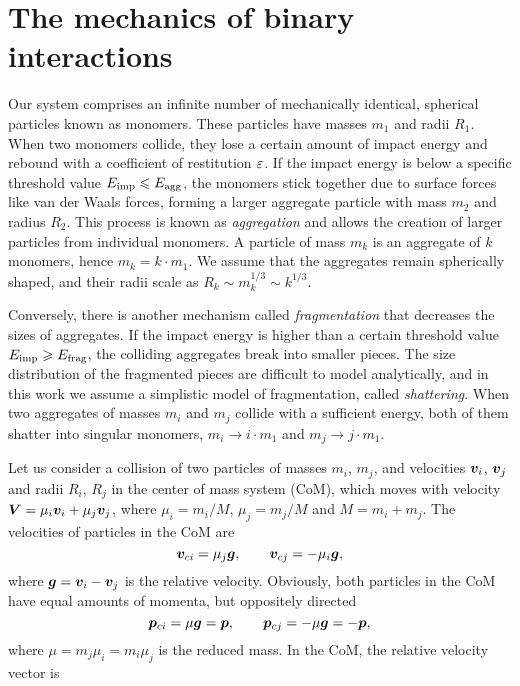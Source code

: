 \documentclass[aps,prl,preprint,groupedaddress,10pt]{revtex4-2}
\begin{document}
\section{The mechanics of binary interactions}
Our system comprises an infinite number of mechanically identical, spherical particles 
known as monomers. These particles have masses $m_1$ and radii $R_1$. When two 
monomers collide, they lose a certain amount of impact energy and rebound with a 
coefficient of restitution $\varepsilon$. If the impact energy is below a specific threshold 
value $E_{\mathrm{imp}}\leqslant E_{\mathrm{agg}}$, the monomers stick together due to surface 
forces like van der Waals forces, forming a larger aggregate particle with mass $m_2$ 
and radius $R_2$. This process is known as \emph{aggregation} and allows the creation 
of larger particles from individual monomers. A particle of mass $m_k$ is an aggregate
of $k$ monomers, hence $m_k=k\cdot m_1$. We assume that the aggregates remain 
spherically shaped, and their radii scale as $R_k\sim m_k^{1/3}\sim k^{1/3}$.

Conversely, there is another mechanism called \emph{fragmentation} that decreases the 
sizes of aggregates. If the impact energy is higher than a certain threshold value 
$E_{\mathrm{imp}}\geqslant E_{\mathrm{frag}}$, the colliding aggregates break into smaller pieces.
The size distribution of the fragmented pieces are difficult to model analytically, and
in this work we assume a simplistic model of fragmentation, called \emph{shattering}.
When two aggregates of masses $m_i$ and $m_j$ collide with a sufficient energy, both 
of them shatter into singular monomers, $m_i\to i\cdot m_1$ and $m_j\to j\cdot m_1$.

Let us consider a collision of two particles of masses $m_i$, $m_j$, and velocities 
$\vb*{v}_i$, $\vb*{v}_j$ and radii $R_i$, $R_j$ in the center of mass system (CoM), which moves 
with velocity $\vb*{V}=\mu_i\vb*{v}_i+\mu_j\vb*{v}_j$, where $\mu_i=m_i/M$, $\mu_j=m_j/M$ and 
$M=m_i+m_j$. The velocities of particles in the CoM are 
\begin{equation}
    \vb*{v}_{ci}=\mu_j\vb*{g},\qquad\vb*{v}_{cj}=-\mu_i\vb*{g},
\end{equation}
where $\vb*{g}=\vb*{v}_i-\vb*{v}_j$ is the relative velocity. Obviously, both particles in the CoM
have equal amounts of momenta, but oppositely directed
\begin{equation}
    \vb*{p}_{ci}=\mu\vb*{g}=\vb*{p},\qquad\vb*{p}_{cj}=-\mu\vb*{g}=-\vb*{p},
\end{equation}
where $\mu=m_j\mu_i=m_i\mu_j$ is the reduced mass. In the CoM, the relative velocity 
vector is 
\end{document}
